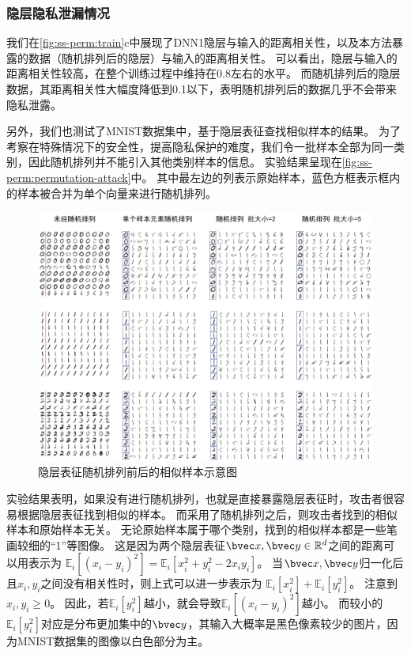 \subsubsection{隐层隐私泄漏情况}
我们在\autoref{fig:ss-perm:train}c中展现了DNN1隐层与输入的距离相关性，以及本方法暴露的数据（随机排列后的隐层）与输入的距离相关性。
%
可以看出，隐层与输入的距离相关性较高，在整个训练过程中维持在0.8左右的水平。
而随机排列后的隐层数据，其距离相关性大幅度降低到0.1以下，表明随机排列后的数据几乎不会带来隐私泄露。
%


另外，我们也测试了MNIST数据集中，基于隐层表征查找相似样本的结果。
%
为了考察在特殊情况下的安全性，提高隐私保护的难度，我们令一批样本全部为同一类别，因此随机排列并不能引入其他类别样本的信息。
%
实验结果呈现在\autoref{fig:ss-perm:permutation-attack}中。
%
其中最左边的列表示原始样本，蓝色方框表示框内的样本被合并为单个向量来进行随机排列。


\begin{figure}[h!]
    \centering
    \includegraphics[width=\linewidth]{Z_Resources/ss-perm_permutation-attack.png}
    \caption{隐层表征随机排列前后的相似样本示意图}
    \label{fig:ss-perm:permutation-attack}
\end{figure}

实验结果表明，如果没有进行随机排列，也就是直接暴露隐层表征时，攻击者很容易根据隐层表征找到相似的样本。
%
而采用了随机排列之后，则攻击者找到的相似样本和原始样本无关。
%
无论原始样本属于哪个类别，找到的相似样本都是一些笔画较细的“1”等图像。
%
这是因为两个隐层表征$\bvec x, \bvec y \in \mathbb R^d$之间的距离可以用表示为
$\mathbb E_i [(x_i - y_i)^2] = \mathbb E_i [x_i^2 + y_i^2 - 2x_i y_i]$。
%
当$\bvec x, \bvec y$归一化后且$x_i, y_i$之间没有相关性时，则上式可以进一步表示为
$\mathbb E_i [x_i^2] + \mathbb E_i [y_i^2]$。
%
注意到$x_i, y_i \ge 0$。
%
因此，若$\mathbb E_i [y_i^2]$越小，就会导致$\mathbb E_i [(x_i - y_i)^2]$越小。
%
而较小的$\mathbb E_i[y_i^2]$对应是分布更加集中的$\bvec y$，其输入大概率是黑色像素较少的图片，因为MNIST数据集的图像以白色部分为主。
%
